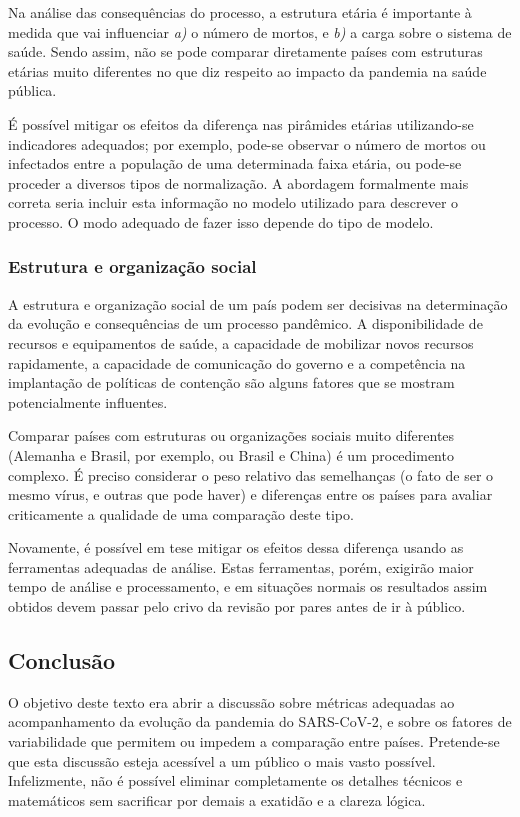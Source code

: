 \documentclass[12pt]{extarticle}
\begin{document}
Na análise das consequências do processo, a estrutura etária é importante à medida que vai influenciar \textit{a)} o número de mortos, e \textit{b)} a carga sobre o sistema de saúde. Sendo assim, não se pode comparar diretamente países com estruturas etárias muito diferentes no que diz respeito ao impacto da pandemia na saúde pública.

É possível mitigar os efeitos da diferença nas pirâmides etárias utilizando-se indicadores adequados; por exemplo, pode-se observar o número de mortos ou infectados entre a população de uma determinada faixa etária, ou pode-se proceder a diversos tipos de normalização. A abordagem formalmente mais correta seria incluir esta informação no modelo utilizado para descrever o processo. O modo adequado de fazer isso depende do tipo de modelo.

\subsubsection{Estrutura e organização social}

A estrutura e organização social de um país podem ser decisivas na determinação da evolução e consequências de um processo pandêmico. A disponibilidade de recursos e equipamentos de saúde, a capacidade de mobilizar novos recursos rapidamente, a capacidade de comunicação do governo e a competência na implantação de políticas de contenção são alguns fatores que se mostram potencialmente influentes.

Comparar países com estruturas ou organizações sociais muito diferentes (Alemanha e Brasil, por exemplo, ou Brasil e China) é um procedimento complexo. É preciso considerar o peso relativo das semelhanças (o fato de ser o mesmo vírus, e outras que pode haver) e diferenças entre os países para avaliar criticamente a qualidade de uma comparação deste tipo.

Novamente, é possível em tese mitigar os efeitos dessa diferença usando as ferramentas adequadas de análise. Estas ferramentas, porém, exigirão maior tempo de análise e processamento, e em situações normais os resultados assim obtidos devem passar pelo crivo da revisão por pares antes de ir à público.

\subsection{Conclusão}

O objetivo deste texto era abrir a discussão sobre métricas adequadas ao acompanhamento da evolução da pandemia do SARS-CoV-2, e sobre os fatores de variabilidade que permitem ou impedem a comparação entre países. Pretende-se que esta discussão esteja acessível a um público o mais vasto possível. Infelizmente, não é possível eliminar completamente os detalhes técnicos e matemáticos sem sacrificar por demais a exatidão e a clareza lógica.
\end{document}
